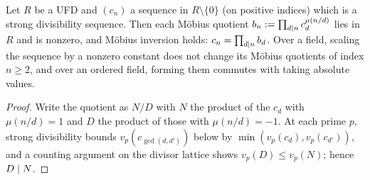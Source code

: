 \begin{lemma}
  \label{lem:moebiusfactor}
  \leanok
  Let $R$ be a UFD and $(c_n)$ a sequence in $R \setminus \{0\}$ (on positive indices) which is a
  strong divisibility sequence. Then each Möbius quotient
  $b_n := \prod_{d \mathrel{\mid} n} c_d^{\mu(n/d)}$ lies in $R$ and is nonzero, and Möbius inversion
  holds: $c_n = \prod_{d \mathrel{\mid} n} b_d$. Over a field, scaling the sequence by a nonzero constant
  does not change its Möbius quotients of index $n \ge 2$, and over an ordered field, forming them
  commutes with taking absolute values.
\end{lemma}
\begin{proof}
  \leanok
  Write the quotient as $N/D$ with $N$ the product of the $c_d$ with $\mu(n/d) = 1$ and $D$ the
  product of those with $\mu(n/d) = -1$. At each prime $p$, strong divisibility bounds
  $v_p(c_{\gcd(d,d')})$ below by $\min(v_p(c_d), v_p(c_{d'}))$, and a counting argument on the
  divisor lattice shows $v_p(D) \le v_p(N)$; hence $D \mathrel{\mid} N$.
\end{proof}

